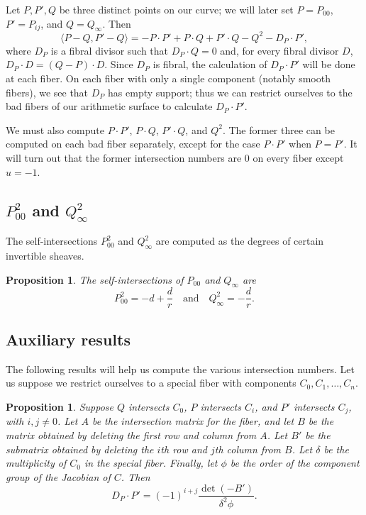\documentclass[reqno]{amsart}
\newtheorem{proposition}[thm]{Proposition}
\theoremstyle{definition}
\theoremstyle{remark}
\begin{document}
Let $P, P', Q$ be three distinct points on our curve; we will later set $P = P_{00}$, $P' = P_{ij}$, and $Q = Q_\infty$. Then
\[
\langle P - Q, P' - Q\rangle = -P \cdot P' + P \cdot Q + P' \cdot Q - Q^2 - D_P \cdot P',
\]
 where $D_P$ is a fibral divisor such that $D_P \cdot Q = 0$ and, for every fibral divisor $D$, $D_P \cdot D = (Q - P) \cdot D$. Since $D_P$ is fibral, the calculation of $D_P \cdot P'$ will be done at each fiber. On each fiber with only a single component (notably smooth fibers), we see that $D_P$ has empty support; thus we can restrict ourselves to the bad fibers of our arithmetic surface to calculate $D_P \cdot P'$. 

We must also compute $P \cdot P'$, $P \cdot Q$, $P' \cdot Q$, and $Q^2$. The former three can be computed on each bad fiber separately, except for the case $P \cdot P'$ when $P = P'$. It will turn out that the former intersection numbers are 0 on every fiber except $u = -1$. 

\subsection{$P_{00}^2$ and $Q_\infty^2$}
\label{sec:p_002-q_infty2}

The self-intersections $P_{00}^2$ and $Q_\infty^2$ are computed as the degrees of certain invertible sheaves.
\begin{proposition}\label{prop:Q-infty-self-intersection}
  The self-intersections of $P_{00}$ and $Q_\infty$ are
  \[
  P_{00}^2 = -d + \frac{d}{r} \quad \text{and} \quad Q_\infty^2 = -\frac{d}{r}.
  \]
\end{proposition}


\subsection{Auxiliary results}
\label{sec:auxiliary-results}

The following results will help us compute the various intersection numbers. Let us suppose we restrict ourselves to a special fiber with components $C_0, C_1, \dots, C_n$.

\begin{proposition}\label{prop:dp-dot-p-cofactor}
  Suppose $Q$ intersects $C_0$, $P$ intersects $C_i$, and $P'$ intersects $C_j$, with $i,j \neq 0$. Let $A$ be the intersection matrix for the fiber, and let $B$ be the matrix obtained by deleting the first row and column from $A$. Let $B'$ be the submatrix obtained by deleting the $i$th row and $j$th column from $B$. Let $\delta$ be the multiplicity of $C_0$ in the special fiber. Finally, let $\phi$ be the order of the component group of the Jacobian of $C$. Then
  \[
  D_P \cdot P' = (-1)^{i+j} \frac{\det (-B')}{\delta^2 \phi}.
  \]
\end{proposition}
\end{document}
